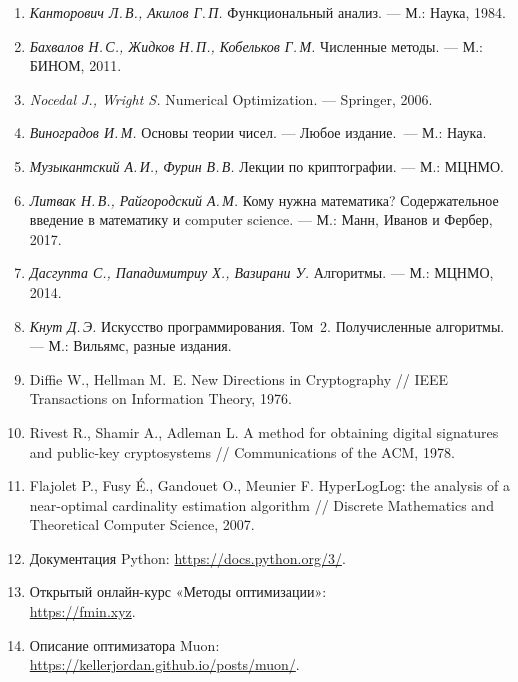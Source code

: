 \documentclass[11pt, openany, twoside]{book}
\begin{document}
\noindent\small
\begin{enumerate}\itemsep2pt
  \item \emph{Канторович Л.\,В., Акилов Г.\,П.} Функциональный анализ. ---
        М.: Наука, 1984.
  \item \emph{Бахвалов Н.\,С., Жидков Н.\,П., Кобельков Г.\,М.}
        Численные методы. --- М.: БИНОМ, 2011.
  \item \emph{Nocedal J., Wright S.} Numerical Optimization. ---
        Springer, 2006.
  \item \emph{Виноградов И.\,М.} Основы теории чисел. ---
        Любое издание.~--- М.: Наука.
  \item \emph{Музыкантский А.\,И., Фурин В.\,В.} Лекции по криптографии. ---
        М.: МЦНМО.
  \item \emph{Литвак Н.\,В., Райгородский А.\,М.} Кому нужна математика?
        Содержательное введение в математику и computer science. ---
        М.: Манн, Иванов и Фербер, 2017.
  \item \emph{Дасгупта С., Пападимитриу Х., Вазирани У.}
        Алгоритмы. --- М.: МЦНМО, 2014.
  \item \emph{Кнут Д.\,Э.} Искусство программирования. Том~2.
        Получисленные алгоритмы. --- М.: Вильямс, разные издания.
  \item Diffie W., Hellman M.~E. New Directions in Cryptography //
        IEEE Transactions on Information Theory, 1976.
  \item Rivest R., Shamir A., Adleman L. A method for obtaining
        digital signatures and public-key cryptosystems //
        Communications of the ACM, 1978.
  \item Flajolet P., Fusy É., Gandouet O., Meunier F.
        HyperLogLog: the analysis of a near-optimal cardinality
        estimation algorithm // Discrete Mathematics and Theoretical
        Computer Science, 2007.
  \item Документация Python: \url{https://docs.python.org/3/}.
  \item Открытый онлайн-курс «Методы оптимизации»:\\
        \url{https://fmin.xyz}.
  \item Описание оптимизатора Muon:\\
        \url{https://kellerjordan.github.io/posts/muon/}.
\end{enumerate}
\end{document}
